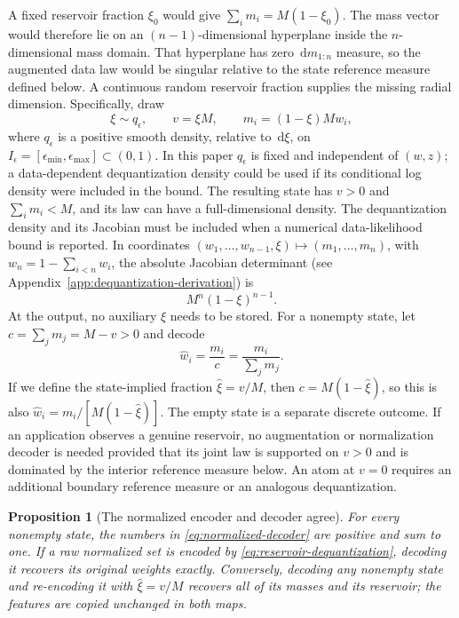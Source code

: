 \documentclass[10pt]{article}
\newtheorem{proposition}[theorem]{Proposition}
\theoremstyle{definition}
\theoremstyle{remark}
\newcommand{\dd}{\,\mathrm{d}}
\begin{document}
A fixed reservoir fraction $\xi_0$ would give
$\sum_i m_i=M(1-\xi_0)$.  The mass vector would therefore lie on an
$(n-1)$-dimensional hyperplane inside the $n$-dimensional mass domain.  That
hyperplane has zero $\dd m_{1:n}$ measure, so the augmented data law would
be singular relative to the state reference measure defined below.  A
continuous random reservoir fraction supplies the missing radial dimension.
Specifically, draw
\begin{equation}
  \xi\sim q_\epsilon,
  \qquad
  v=\xi M,
  \qquad
  m_i=(1-\xi)Mw_i,
  \label{eq:reservoir-dequantization}
\end{equation}
where $q_\epsilon$ is a positive smooth density, relative to $\dd\xi$, on
$I_\epsilon=[\epsilon_{\min},\epsilon_{\max}]\subset(0,1)$.  In this paper
$q_\epsilon$ is fixed and independent of $(w,z)$; a data-dependent
dequantization density could be used if its conditional log density were
included in the bound.  The resulting state has $v>0$ and
$\sum_i m_i<M$, and its law can have a full-dimensional density.  The
dequantization density and its Jacobian must be included when a numerical
data-likelihood bound is reported.  In
coordinates $(w_1,\ldots,w_{n-1},\xi)\mapsto(m_1,\ldots,m_n)$, with
$w_n=1-\sum_{i<n}w_i$, the absolute Jacobian determinant (see
Appendix~\ref{app:dequantization-derivation}) is
\begin{equation}
  M^n(1-\xi)^{n-1}.
  \label{eq:dequantization-jacobian}
\end{equation}
At the output, no auxiliary $\xi$ needs to be stored.  For a nonempty state,
let $c=\sum_jm_j=M-v>0$ and decode
\begin{equation}
  \widehat w_i=\frac{m_i}{c}=\frac{m_i}{\sum_jm_j}.
  \label{eq:normalized-decoder}
\end{equation}
If we define the state-implied fraction $\widehat\xi=v/M$, then
$c=M(1-\widehat\xi)$, so this is also
$\widehat w_i=m_i/[M(1-\widehat\xi)]$.  The empty state is a separate
discrete outcome.  If an application observes a genuine reservoir, no
augmentation or normalization decoder is needed provided that its joint law
is supported on $v>0$ and is dominated by the interior reference measure
below.  An atom at $v=0$ requires an additional boundary reference measure
or an analogous dequantization.

\begin{proposition}[The normalized encoder and decoder agree]
\label{prop:encode-decode}
For every nonempty state, the numbers in
\eqref{eq:normalized-decoder} are positive and sum to one.  If a raw
normalized set is encoded by \eqref{eq:reservoir-dequantization}, decoding
it recovers its original weights exactly.  Conversely, decoding any
nonempty state and re-encoding it with $\widehat\xi=v/M$ recovers all of its
masses and its reservoir; the features are copied unchanged in both maps.
\end{proposition}
\end{document}
